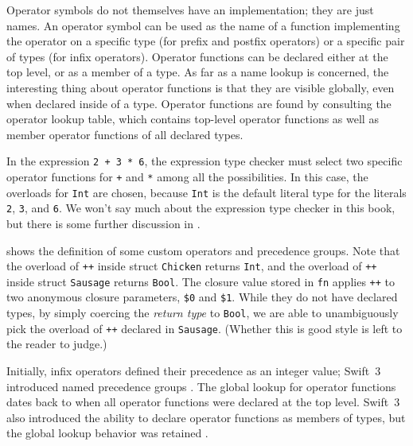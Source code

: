 \documentclass[../generics]{subfiles}
\begin{document}
Operator symbols do not themselves have an implementation; they are just names. An operator symbol can be used as the name of a function implementing the operator on a specific type (for prefix and postfix operators) or a specific pair of types (for infix operators). Operator functions can be declared either at the top level, or as a member of a type. As far as a name lookup is concerned, the interesting thing about operator functions is that they are visible globally, even when declared inside of a type. Operator functions are found by consulting the operator lookup table, which contains top-level operator functions as well as member operator functions of all declared types.

In the expression \texttt{2 + 3 * 6}, the expression type checker must select two specific operator functions for \texttt{+} and \texttt{*} among all the possibilities. In this case, the overloads for \texttt{Int} are chosen, because \texttt{Int} is the default literal type for the literals \texttt{2}, \texttt{3}, and \texttt{6}. We won't say much about the expression type checker in this book, but there is some further discussion in .

\begin{listing}\label{customops}
\end{listing}
 shows the definition of some custom operators and precedence groups. Note that the overload of \texttt{++} inside struct \texttt{Chicken} returns \texttt{Int}, and the overload of \texttt{++} inside struct \texttt{Sausage} returns \texttt{Bool}. The closure value stored in \texttt{fn} applies \texttt{++} to two anonymous closure parameters, \verb|$0| and \verb|$1|. While they do not have declared types, by simply coercing the \emph{return type} to \texttt{Bool}, we are able to unambiguously pick the overload of \texttt{++} declared in \texttt{Sausage}. (Whether this is good style is left to the reader to judge.)

Initially, infix operators defined their precedence as an integer value; Swift~3 introduced named precedence groups \cite{se0077}. The global lookup for operator functions dates back to when all operator functions were declared at the top level. Swift~3 also introduced the ability to declare operator functions as members of types, but the global lookup behavior was retained \cite{se0091}.
\end{document}
